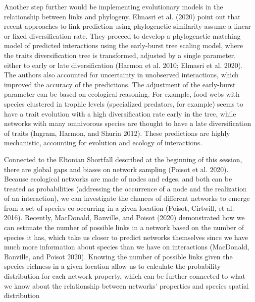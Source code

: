 \documentclass[11pt]{article}
\begin{document}
Another step further would be implementing evolutionary models in the
relationship between links and phylogeny. Elmasri et al. (2020) point
out that recent approaches to link prediction using phylogenetic
similarity assume a linear or fixed diversification rate. They proceed
to develop a phylogenetic matching model of predicted interactions using
the early-burst tree scaling model, where the traits diversification
tree is transformed, adjusted by a single parameter, either to early or
late diversification (Harmon et al. 2010; Elmasri et al. 2020). The
authors also accounted for uncertainty in unobserved interactions, which
improved the accuracy of the predictions. The adjustment of the
early-burst parameter can be based on ecological reasoning. For example,
food webs with species clustered in trophic levels (specialized
predators, for example) seems to have a trait evolution with a high
diversification rate early in the tree, while networks with many
omnivorous species are thought to have a late diversification of traits
(Ingram, Harmon, and Shurin 2012). These predictions are highly
mechanistic, accounting for evolution and ecology of interactions.

Connected to the Eltonian Shortfall described at the beginning of this
session, there are global gaps and biases on network sampling (Poisot et
al. 2020). Because ecological networks are made of nodes and edges, and
both can be treated as probabilities (addressing the occurrence of a
node and the realization of an interaction), we can investigate the
chances of different networks to emerge from a set of species
co-occurring in a given location (Poisot, Cirtwill, et al. 2016).
Recently, MacDonald, Banville, and Poisot (2020) demonstrated how we can
estimate the number of possible links in a network based on the number
of species it has, which take us closer to predict networks themselves
since we have much more information about species than we have on
interactions (MacDonald, Banville, and Poisot 2020). Knowing the number
of possible links given the species richness in a given location allow
us to calculate the probability distribution for each network property,
which can be further connected to what we know about the relationship
between networks' properties and species spatial distribution
\end{document}
